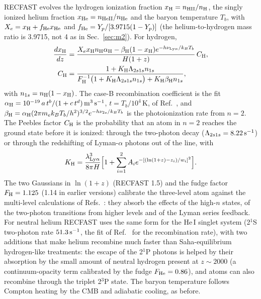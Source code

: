RECFAST evolves the hydrogen ionization fraction $x_{\rm H}=n_{\rm HII}/n_{\rm H}$, the singly ionized helium
fraction $x_{\rm He}=n_{\rm HeII}/n_{\rm He}$ and the baryon temperature $T_b$, with $X_e=x_{\rm H}+f_{\rm He}x_{\rm He}$
and $f_{\rm He}=Y_p/[3.9715(1-Y_p)]$ (the helium-to-hydrogen mass ratio is 3.9715, not 4 as in Sec.~\ref{sec:m2}).
For hydrogen,
\begin{align}
\frac{dx_{\rm H}}{dz}&=\frac{X_ex_{\rm H}n_{\rm H}\alpha_{\rm H}-\beta_{\rm H}(1-x_{\rm H})e^{-h\nu_{\rm Ly\alpha}/k_BT_b}}
{H(1+z)}\,C_{\rm H},\\
C_{\rm H}&=\frac{1+K_{\rm H}\Lambda_{2s1s}n_{1s}}{F_{\rm H}^{-1}\big(1+K_{\rm H}\Lambda_{2s1s}n_{1s}\big)+K_{\rm H}\beta_{\rm H}n_{1s}},
\end{align}
with $n_{1s}=n_{\rm H}(1-x_{\rm H})$. The case-B recombination coefficient is the fit
$\alpha_{\rm H}=10^{-19}\,a\,t^b/(1+c\,t^d)\,{\rm m^3\,s^{-1}}$, $t=T_b/10^4$\,K, of
Ref.~\cite{Pequignot1991}, and $\beta_{\rm H}=\alpha_{\rm H}(2\pi m_ek_BT_b/h^2)^{3/2}e^{-h\nu_{2s}/k_BT_b}$ is the
photoionization rate from $n=2$. The Peebles factor $C_{\rm H}$ is the probability that an atom in $n=2$ reaches
the ground state before it is ionized: through the two-photon decay ($\Lambda_{2s1s}=8.22\,{\rm s^{-1}}$) or
through the redshifting of Lyman-$\alpha$ photons out of the line, with
\begin{equation}
K_{\rm H}=\frac{\lambda_{\rm Ly\alpha}^3}{8\pi H}\Big[1+\sum_{i=1}^2A_ie^{-[(\ln(1+z)-z_i)/w_i]^2}\Big].
\end{equation}
The two Gaussians in $\ln(1+z)$ (RECFAST 1.5) and the fudge factor $F_{\rm H}=1.125$ (1.14 in earlier versions)
calibrate the three-level atom against the multi-level calculations of Refs.~\cite{RubinoMartin2010,Wong2008}: they
absorb the effects of the high-$n$ states, of the two-photon transitions from higher levels and of the Lyman series
feedback. For neutral helium RECFAST uses the same form for the He\,I singlet system (2$^1$S two-photon rate
$51.3\,{\rm s^{-1}}$, the fit of Ref.~\cite{Verner1996} for the recombination rate), with two additions that make
helium recombine much faster than Saha-equilibrium hydrogen-like treatments: the escape of the 2$^1$P photons is
helped by their absorption by the small amount of neutral hydrogen present at $z\sim2000$ (a continuum-opacity term
calibrated by the fudge $F_{\rm He}=0.86$), and atoms can also recombine through the triplet 2$^3$P state. The
baryon temperature follows Compton heating by the CMB and adiabatic cooling, as before.

